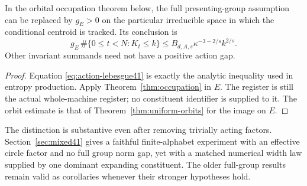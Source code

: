 \begin{corollary}\label{cor:action-budget41}
In the orbital occupation theorem below, the full presenting-group
assumption can be replaced by $g_E>0$ on the particular irreducible
space in which the conditional centroid is tracked. Its conclusion is
\[
 g_E\,\#\{0\le t<N:K_t\le k\}
 \le B_{d,A,s}\kappa^{-3-2/s}k^{2/s}.
\]
Other invariant summands need not have a positive action gap.
\end{corollary}
\begin{proof}
Equation \eqref{eq:action-lebesgue41} is exactly the analytic inequality
used in entropy production. Apply Theorem~\ref{thm:occupation} in $E$.
The register is still the actual whole-machine register; no constituent
identifier is supplied to it. The orbit estimate is that of
Theorem~\ref{thm:uniform-orbits} for the image on $E$.
\end{proof}

The distinction is substantive even after removing trivially acting
factors. Section~\ref{sec:mixed41} gives a faithful finite-alphabet
experiment with an effective circle factor and no full group norm gap,
yet with a matched numerical width law supplied by one dominant
expanding constituent. The older full-group results remain valid as
corollaries whenever their stronger hypotheses hold.
